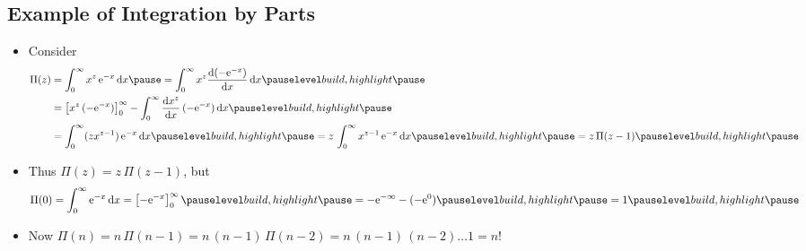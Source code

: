 \begin{slide}
\section[-2]{Example of Integration by Parts}

\begin{PauseHighLight}
  \begin{itemize}
  \item Consider
    \begin{align*}
      \Pi(z) &= \int_0^\infty x^z \, \e{-x} \, \dd x\pause = 
      \int_0^\infty x^z \frac{\dd (-\e{-x})}{\dd x} \, \dd x \pauseb\\
      &= \left[ x^z\, (-\e{-x})  \right]_0^\infty - \int_0^\infty 
        \frac{\dd x^z}{\dd x}\, (-\e{-x}) \, \dd x\pauseb\\
             &= \int_0^\infty  (z x^{z-1}) \, \e{-x} \, \dd x \pauseb
               = z\,\int_0^\infty x^{z-1} \,  \e{-x} \,  \dd x \pauseb
               = z\,\Pi(z-1) \pauseb
    \end{align*}
  \item Thus $\Pi(z) = z\, \Pi(z-1)$, but
    \begin{align*}
      \Pi(0) = \int_0^\infty \e{-x} \,\dd x = \left[ -\e{-x}
      \right]_0^\infty\pauseb
      = -\e{-\infty} - (-\e{0}) \pauseb = 1\pauseb
    \end{align*}
  \item Now $\Pi(n) = n\,\Pi(n-1) = n\,(n-1)\,\Pi(n-2) =
    n\,(n-1)\,(n-2)\ldots1 = n!$\pauseb
  \end{itemize}
\end{PauseHighLight}

\end{slide}


